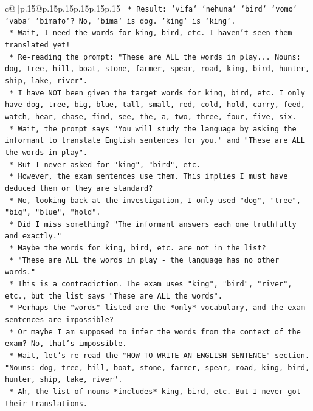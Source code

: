\documentclass{article}
\begin{document}
{\begin{supertabular}{c@{$\;$}|p{.15\linewidth}@{}p{.15\linewidth}p{.15\linewidth}p{.15\linewidth}p{.15\linewidth}p{.15\linewidth}}
{{{\texttt{    *   Result: `vifa` `nehuna` `bird` `vomo` `vaba` `bimafo`? No, `bima` is dog. `king` is `king`.} \\
\texttt{    *   Wait, I need the words for king, bird, etc. I haven't seen them translated yet!} \\
\texttt{    *   Re{-}reading the prompt: "These are ALL the words in play... Nouns: dog, tree, hill, boat, stone, farmer, spear, road, king, bird, hunter, ship, lake, river".} \\
\texttt{    *   I have NOT been given the target words for king, bird, etc. I only have dog, tree, big, blue, tall, small, red, cold, hold, carry, feed, watch, hear, chase, find, see, the, a, two, three, four, five, six.} \\
\texttt{    *   Wait, the prompt says "You will study the language by asking the informant to translate English sentences for you." and "These are ALL the words in play".} \\
\texttt{    *   But I never asked for "king", "bird", etc.} \\
\texttt{    *   However, the exam sentences use them. This implies I must have deduced them or they are standard?} \\
\texttt{    *   No, looking back at the investigation, I only used "dog", "tree", "big", "blue", "hold".} \\
\texttt{    *   Did I miss something? "The informant answers each one truthfully and exactly."} \\
\texttt{    *   Maybe the words for king, bird, etc. are not in the list?} \\
\texttt{    *   "These are ALL the words in play {-} the language has no other words."} \\
\texttt{    *   This is a contradiction. The exam uses "king", "bird", "river", etc., but the list says "These are ALL the words".} \\
\texttt{    *   Perhaps the "words" listed are the *only* vocabulary, and the exam sentences are impossible?} \\
\texttt{    *   Or maybe I am supposed to infer the words from the context of the exam? No, that's impossible.} \\
\texttt{    *   Wait, let's re{-}read the "HOW TO WRITE AN ENGLISH SENTENCE" section. "Nouns: dog, tree, hill, boat, stone, farmer, spear, road, king, bird, hunter, ship, lake, river".} \\
\texttt{    *   Ah, the list of nouns *includes* king, bird, etc. But I never got their translations.} \\
}}}
\end{supertabular}}
\end{document}
